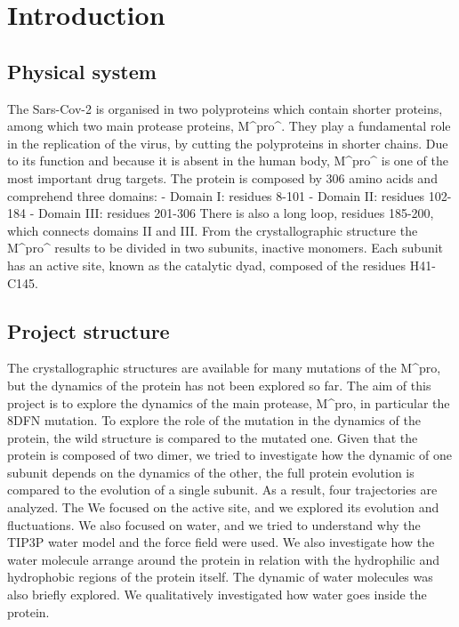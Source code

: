 \chapter{Introduction}
\section{Physical system}
The Sars-Cov-2 is organised in two polyproteins which contain shorter proteins, among which two main protease proteins, M^pro^. They play a fundamental role in the replication of the virus, by cutting the polyproteins in shorter chains. Due to its function and because it is absent in the human body, M^pro^ is one of the most important drug targets. 
The protein is composed by 306 amino acids and comprehend three domains:
- Domain I: residues 8-101
- Domain II: residues 102-184
- Domain III: residues 201-306
There is also a long loop, residues 185-200, which connects domains II and III. 
From the crystallographic structure the M^pro^ results to be divided in two subunits, inactive monomers. Each subunit has an active site, known as the catalytic dyad, composed of the residues H41-C145. 
\section{Project structure}
The crystallographic structures are available for many mutations of the M^{pro}, but the dynamics of the protein has not been explored so far. The aim of this project is to explore the dynamics of the main protease, M^{pro}, in particular the 8DFN mutation. 
To explore the role of the mutation in the dynamics of the protein, the wild structure is compared to the mutated one. Given that the protein is composed of two dimer, we tried to investigate how the dynamic of one subunit depends on the dynamics of the other, the full protein evolution is compared to the evolution of a single subunit. As a result, four trajectories are analyzed. 
The 
We focused on the active site, and we explored its evolution and fluctuations. 
We also focused on water, and we tried to understand why the TIP3P water model and the  force field were used. We also investigate how the water molecule arrange around the protein in relation with the hydrophilic and hydrophobic regions of the protein itself. The dynamic of water molecules was also briefly explored. We qualitatively investigated how water goes inside the protein. 
